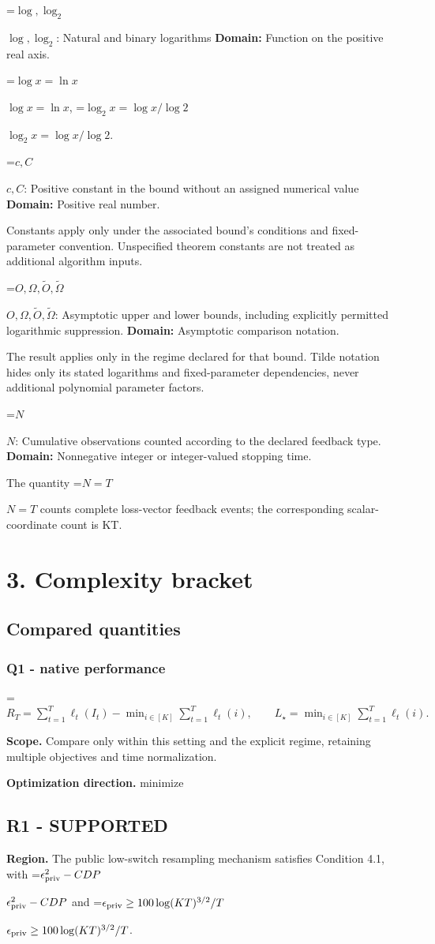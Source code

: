 \documentclass[10pt,a4paper]{article}
\newcommand{\AtlasMath}[1]{\par\begingroup\centering\setbox0=\hbox{$\displaystyle #1$}\ifdim\wd0>1.4\linewidth\typeout{ATLAS WIDE FORMULA: \the\wd0}\fi\ifdim\wd0>\linewidth\resizebox{\linewidth}{!}{\box0}\else\box0\fi\par\endgroup}
\newcommand{\AtlasInlineMath}[1]{\begingroup\setbox0=\hbox{$#1$}\ifdim\wd0>.4\linewidth\endgroup\AtlasMath{#1}\else\endgroup$#1$\fi}
\begin{document}
\AtlasInlineMath{\log,\log_2}: Natural and binary logarithms \textbf{Domain:} Function on the positive real axis.

\AtlasInlineMath{\log x=\ln x}, \AtlasInlineMath{\log_2x=\log x/\log2}.

\AtlasInlineMath{c,C}: Positive constant in the bound without an assigned numerical value \textbf{Domain:} Positive real number.

Constants apply only under the associated bound’s conditions and fixed-parameter convention. Unspecified theorem constants are not treated as additional algorithm inputs.

\AtlasInlineMath{O,\Omega,\widetilde O,\widetilde\Omega}: Asymptotic upper and lower bounds, including explicitly permitted logarithmic suppression. \textbf{Domain:} Asymptotic comparison notation.

The result applies only in the regime declared for that bound. Tilde notation hides only its stated logarithms and fixed-parameter dependencies, never additional polynomial parameter factors.

\AtlasInlineMath{N}: Cumulative observations counted according to the declared feedback type. \textbf{Domain:} Nonnegative integer or integer-valued stopping time.

The quantity \AtlasInlineMath{N=T} counts complete loss-vector feedback events; the corresponding scalar-coordinate count is KT.

\section{3. Complexity bracket}
\subsection{Compared quantities}
\subsubsection{Q1 - native performance}
\AtlasMath{R_T=\sum_{t=1}^T\ell_t(I_t)-\min_{i\in[K]}\sum_{t=1}^T\ell_t(i),\qquad L_\star=\min_{i\in[K]}\sum_{t=1}^T\ell_t(i).}
\textbf{Scope.} Compare only within this setting and the explicit regime, retaining multiple objectives and time normalization.

\textbf{Optimization direction.} minimize

\subsection{R1 - SUPPORTED}
\textbf{Region.} The public low-switch resampling mechanism satisfies Condition 4.1, with \AtlasInlineMath{\epsilon_{\rm priv}^{2}-CDP} and \AtlasInlineMath{\epsilon_{\rm priv}\ge 100\log(KT)^{3/2}/T}.
\end{document}
